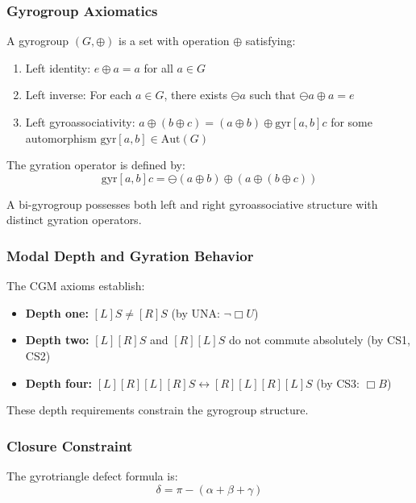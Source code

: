 \documentclass[11pt,a4paper]{article}
\theoremstyle{definition}
\theoremstyle{remark}
\begin{document}
\subsubsection{Gyrogroup Axiomatics}

A gyrogroup $(G, \oplus)$ is a set with operation $\oplus$ satisfying:
\begin{enumerate}
\item Left identity: $e \oplus a = a$ for all $a \in G$
\item Left inverse: For each $a \in G$, there exists $\ominus a$ such that $\ominus a \oplus a = e$
\item Left gyroassociativity: $a \oplus (b \oplus c) = (a \oplus b) \oplus \mathrm{gyr}[a,b]c$ for some automorphism $\mathrm{gyr}[a,b] \in \mathrm{Aut}(G)$
\end{enumerate}

The gyration operator is defined by:
\begin{equation}
\mathrm{gyr}[a,b]c = \ominus(a \oplus b) \oplus (a \oplus (b \oplus c))
\end{equation}

A bi-gyrogroup possesses both left and right gyroassociative structure with distinct gyration operators.

\subsubsection{Modal Depth and Gyration Behavior}

The CGM axioms establish:
\begin{itemize}
\item \textbf{Depth one:} $[L]S \neq [R]S$ (by UNA: $\neg\Box U$)
\item \textbf{Depth two:} $[L][R]S$ and $[R][L]S$ do not commute absolutely (by CS1, CS2)
\item \textbf{Depth four:} $[L][R][L][R]S \leftrightarrow [R][L][R][L]S$ (by CS3: $\Box B$)
\end{itemize}

These depth requirements constrain the gyrogroup structure.

\subsubsection{Closure Constraint}

The gyrotriangle defect formula is:
\begin{equation}
\delta = \pi - (\alpha + \beta + \gamma)
\end{equation}
\end{document}
